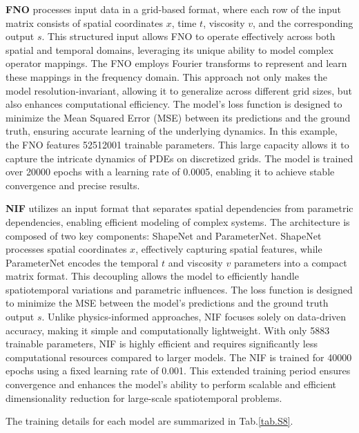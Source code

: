 \textbf{FNO} processes input data in a grid-based format, where each row of the input matrix consists of spatial coordinates $x$, time $t$, viscosity $v$, and the corresponding output $s$. This structured input allows FNO to operate effectively across both spatial and temporal domains, leveraging its unique ability to model complex operator mappings. The FNO employs Fourier transforms to represent and learn these mappings in the frequency domain. This approach not only makes the model resolution-invariant, allowing it to generalize across different grid sizes, but also enhances computational efficiency. The model’s loss function is designed to minimize the Mean Squared Error (MSE) between its predictions and the ground truth, ensuring accurate learning of the underlying dynamics.
In this example, the FNO features 52512001 trainable parameters. This large capacity allows it to capture the intricate dynamics of PDEs on discretized grids. The model is trained over 20000 epochs with a learning rate of 0.0005, enabling it to achieve stable convergence and precise results.

\textbf{NIF} utilizes an input format that separates spatial dependencies from parametric dependencies, enabling efficient modeling of complex systems. The architecture is composed of two key components: ShapeNet and ParameterNet. ShapeNet processes spatial coordinates $x$, effectively capturing spatial features, while ParameterNet encodes the temporal $t$ and viscosity $v$ parameters into a compact matrix format. This decoupling allows the model to efficiently handle spatiotemporal variations and parametric influences. The loss function is designed to minimize the MSE between the model’s predictions and the ground truth output $s$. Unlike physics-informed approaches, NIF focuses solely on data-driven accuracy, making it simple and computationally lightweight. With only 5883 trainable parameters, NIF is highly efficient and requires significantly less computational resources compared to larger models. The NIF is trained for 40000 epochs using a fixed learning rate of 0.001. This extended training period ensures convergence and enhances the model's ability to perform scalable and efficient dimensionality reduction for large-scale spatiotemporal problems.

The training details for each model are summarized in Tab.\ref{tab.S8}.

